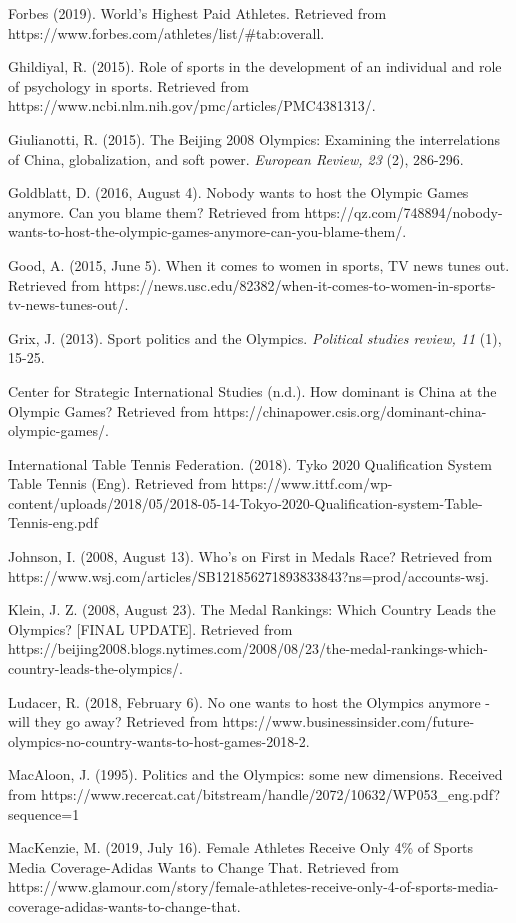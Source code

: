 \documentclass[12pt]{article}
\begin{document}
\begin{hangparas}{.25in}{1}
Forbes (2019). World's Highest Paid Athletes. Retrieved from https://www.forbes.com/athletes/list/\#tab:overall.

Ghildiyal, R. (2015). Role of sports in the development of an individual and role of psychology in sports. Retrieved from https://www.ncbi.nlm.nih.gov/pmc/articles/PMC4381313/.

Giulianotti, R. (2015). The Beijing 2008 Olympics: Examining the interrelations of China, globalization, and soft power. \textit {European Review, 23} (2), 286-296.

Goldblatt, D. (2016, August 4). Nobody wants to host the Olympic Games anymore. Can you blame them? Retrieved from https://qz.com/748894/nobody-wants-to-host-the-olympic-games-anymore-can-you-blame-them/.

Good, A. (2015, June 5). When it comes to women in sports, TV news tunes out. Retrieved from https://news.usc.edu/82382/when-it-comes-to-women-in-sports-tv-news-tunes-out/.

Grix, J. (2013). Sport politics and the Olympics. \textit {Political studies review, 11} (1), 15-25.

Center for Strategic International Studies (n.d.). How dominant is China at the Olympic Games? Retrieved from https://chinapower.csis.org/dominant-china-olympic-games/.

International Table Tennis Federation. (2018). Tyko 2020 Qualification System Table Tennis (Eng). Retrieved from https://www.ittf.com/wp-content/uploads/2018/05/2018-05-14-Tokyo-2020-Qualification-system-Table-Tennis-eng.pdf

Johnson, I. (2008, August 13). Who's on First in Medals Race? Retrieved from https://www.wsj.com/articles/SB121856271893833843?ns=prod/accounts-wsj.

Klein, J. Z. (2008, August 23). The Medal Rankings: Which Country Leads the Olympics? [FINAL UPDATE]. Retrieved from https://beijing2008.blogs.nytimes.com/2008/08/23/the-medal-rankings-which-country-leads-the-olympics/.

Ludacer, R. (2018, February 6). No one wants to host the Olympics anymore - will they go away? Retrieved from https://www.businessinsider.com/future-olympics-no-country-wants-to-host-games-2018-2.

MacAloon, J. (1995). Politics and the Olympics: some new dimensions. Received from https://www.recercat.cat/bitstream/handle/2072/10632/WP053_eng.pdf?sequence=1

MacKenzie, M. (2019, July 16). Female Athletes Receive Only 4\% of Sports Media Coverage-Adidas Wants to Change That. Retrieved from https://www.glamour.com/story/female-athletes-receive-only-4-of-sports-media-coverage-adidas-wants-to-change-that.


\end{hangparas}
\end{document}

